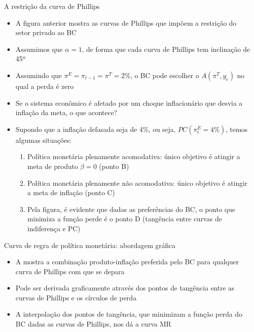 \documentclass[10pt]{beamer}
\begin{document}
\begin{frame}
    {A restrição da curva de Phillips}
    \begin{itemize}
        \item A figura anterior mostra as curvas de Phillips que impõem a restrição do setor privado ao BC\bigskip
        \item Assumimos que $\alpha = 1$, de forma que cada curva de Phillips tem inclinação de 45º\bigskip
        \item Assumindo que $\pi^E = \pi_{t-1} = \pi^T = 2\%$, o BC pode escolher o  $A (\pi^T, y_e)$ no qual a perda é zero\bigskip
        \item Se o sistema econômico é afetado por um choque inflacionário que desvia a inflação da meta, o que acontece? \bigskip
        \item Supondo que a inflação defasada seja de 4\%, ou seja, $PC(\pi_t^E = 4\%)$, temos algumas situações:\medskip
        \begin{enumerate}
            \item Política monetária plenamente acomodativa: único objetivo é atingir a meta de produto $\beta = 0$ (ponto B)\medskip
            \item Política monetária plenamente não acomodativa: único objetivo é atingir a meta de inflação (ponto C)\medskip
            \item Pela figura, é evidente que dadas as preferências do BC, o ponto que minimiza a função perde é o ponto D (tangência entre curvas de indiferença e PC)
        \end{enumerate}
    \end{itemize}
\end{frame}

\begin{frame}
    {Curva de regra de política monetária: abordagem gráfica}
    \begin{itemize}
        \item A  mostra a combinação produto-inflação preferida pelo BC para qualquer curva de Phillips com que se depara\bigskip
        \item Pode ser derivada graficamente através dos pontos de tangência entre as curvas de Phillips e os círculos de perda\bigskip
        \item A interpolação dos pontos de tangência, que minimizam a função perda do BC dadas as curvas de Phillips, nos dá a curva MR
    \end{itemize}
\end{frame}
\end{document}
